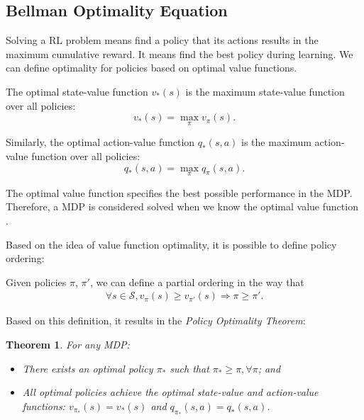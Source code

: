 \subsection{Bellman Optimality Equation}

Solving a RL problem means find a policy that its actions results in the maximum cumulative reward. It means find the best policy during learning. We can define optimality for policies based on optimal value functions.

\begin{definition}
	The optimal state-value function $v_{*}(s)$ is the maximum state-value function over all policies:
	\begin{equation}
	v_{*}(s) = \max_{\pi} v_{\pi}(s).
	\end{equation}
	
	Similarly, the optimal action-value function $q_{*}(s,a)$ is the maximum action-value function over all policies:
	\begin{equation}
	q_{*}(s,a) = \max_{\pi} q_{\pi}(s,a).
	\end{equation}
\end{definition}

The optimal value function specifies the best possible performance in the MDP. Therefore, a MDP is considered solved when we know the optimal value function \cite{davidsilverlec2}.

Based on the idea of value function optimality, it is possible to define policy ordering:

\begin{definition}
	Given policies $\pi$, $\pi'$, we can define a partial ordering in the way that
	\begin{align*}
	\forall s \in \mathcal{S}, v_{\pi}(s) \geq v_{\pi'}(s) \Rightarrow \pi \geq \pi'.
	\end{align*}
\end{definition}

Based on this definition, it results in the \textit{Policy Optimality Theorem}:

\newtheorem{optimalpolicy}{Theorem}
\begin{optimalpolicy}
	For any MDP:
	\begin{itemize}
		\item There exists an optimal policy $\pi_{*}$ such that $\pi_{*} \geq \pi, \forall \pi$; and
		\item All optimal policies achieve the optimal state-value and action-value functions: $v_{\pi_{*}}(s) = v_{*}(s)$ and $q_{\pi_{*}}(s,a) = q_{*}(s,a)$.
	\end{itemize}
\end{optimalpolicy}

